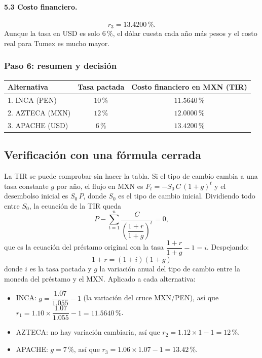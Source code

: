 \documentclass[11pt]{article}
\newcommand{\pc}{\text{\%}}
\begin{document}
\paragraph{5.3 Costo financiero.}
\[
r_3=13.4200\,\pc.
\]
Aunque la tasa en USD es solo $6\,\pc$, el d\'olar cuesta cada a\~no m\'as pesos y el costo real para Tumex es mucho mayor.

\subsubsection*{Paso 6: resumen y decisi\'on}

\begin{center}
\begin{tabular}{l c c}\toprule
Alternativa & Tasa pactada & Costo financiero en MXN (TIR)\\\midrule
1. INCA (PEN) & $10\,\pc$ & $11.5640\,\pc$\\
2. AZTECA (MXN) & $12\,\pc$ & $12.0000\,\pc$\\
3. APACHE (USD) & $6\,\pc$ & $13.4200\,\pc$\\\bottomrule
\end{tabular}
\end{center}

\subsection{Verificaci\'on con una f\'ormula cerrada}

La TIR se puede comprobar sin hacer la tabla. Si el tipo de cambio cambia a una tasa constante $g$ por a\~no, el flujo en MXN es $F_t=-S_0\,C\,(1+g)^t$ y el desembolso inicial es $S_0\,P$, donde $S_0$ es el tipo de cambio inicial. Dividiendo todo entre $S_0$, la ecuaci\'on de la TIR queda
\[
P-\sum_{t=1}^{n}\frac{C}{\left(\dfrac{1+r}{1+g}\right)^{t}}=0 ,
\]
que es la ecuaci\'on del pr\'estamo original con la tasa $\dfrac{1+r}{1+g}-1=i$. Despejando:
\[
\boxed{\,1+r=(1+i)(1+g)\,}
\]
donde $i$ es la tasa pactada y $g$ la variaci\'on anual del tipo de cambio entre la moneda del pr\'estamo y el MXN. Aplicado a cada alternativa:

\begin{itemize}
\item INCA: $g=\dfrac{1.07}{1.055}-1$ (la variaci\'on del cruce MXN/PEN), as\'i que $r_1=1.10\times\dfrac{1.07}{1.055}-1=11.5640\,\pc$.
\item AZTECA: no hay variaci\'on cambiaria, as\'i que $r_2=1.12\times 1-1=12\,\pc$.
\item APACHE: $g=7\,\pc$, as\'i que $r_3=1.06\times 1.07-1=13.42\,\pc$.
\end{itemize}
\end{document}

